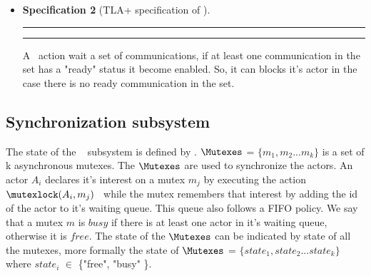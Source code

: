 \documentclass[a4paper,11pt]{article}
\theoremstyle{break}
\newtheorem{TLA}{Specification}
\begin{document}
\begin{itemize}[noitemsep]
\begin{TLA}[TLA+ specification of \test]
\par\noindent\rule{\textwidth}{0.4pt}
\begin{tlatex}

\end{tlatex}
\par\noindent\rule{\textwidth}{0.4pt} 
\end{TLA}
 A \test~tests a set of communications, returning either true or false depending on the status of the communications. If at least one communication in the set has a "done" status, \test~action returns true, otherwise false is given. 
\item \wait
\begin{TLA}[TLA+ specification of \wait]
\par\noindent\rule{\textwidth}{0.4pt}
\begin{tlatex}
	
\end{tlatex}
\par\noindent\rule{\textwidth}{0.4pt} 
\end{TLA}
A \wait~action wait a set of communications, if at least one communication in the set has a "ready" status it become enabled. So, it can blocks it's actor in the case there is no ready communication in the set. 
\end{itemize}

\subsection{Synchronization subsystem}

The state of the \Synchronization~ subsystem is defined by \Mutexes.  $\Mutexes$ = $\{m_1, m_2 ... m_k \}$ is a set of k asynchronous mutexes. The $\Mutexes$ are used to synchronize the actors. An actor $A_i$ declares it's interest on a mutex $m_j$ by executing the action $\mutexlock(A_i,m_j)$~  while the mutex remembers that interest by adding the id of the actor to it's waiting queue. This queue also follows a FIFO policy. We say that a mutex $m$ is $busy$ if there is at least one actor in it's waiting queue, otherwise it is $free$. The state of the $\Mutexes$ can be indicated by state of all the mutexes, more formally the state of $\Mutexes$ = $\{state_1, state_2 ... state_k \}$ where $state_i$ $\in$ \{"free", "busy" \}. 
\end{document}

